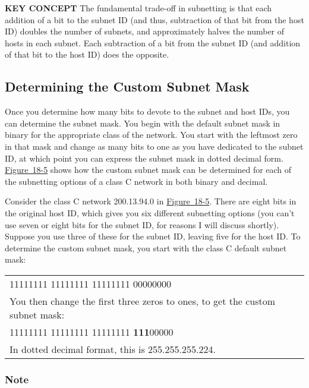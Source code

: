 {\textbf{KEY CONCEPT}} The fundamental trade-off in subnetting is that
each addition of a bit to the subnet ID (and thus, subtraction of that
bit from the host ID) doubles the number of subnets, and approximately
halves the number of hosts in each subnet. Each subtraction of a bit
from the subnet ID (and addition of that bit to the host ID) does the
opposite.

\subsection[Determining the Custom Subnet
Mask]{\texorpdfstring{Determining
the Custom Subnet Mask}{Determining the Custom Subnet Mask}}

Once you determine how many bits to devote to the subnet and host IDs,
you can determine the subnet mask. You begin with the default subnet
mask in binary for the appropriate class of the network. You start with
the leftmost zero in that mask and change as many bits to one as you
have dedicated to the subnet ID, at which point you can express the
subnet mask in dotted decimal form.
\protect\hyperlink{ch18s05.htmlux5cux23custom_subnet_masks_for_class_c_networks}{Figure~18-5}
shows how the custom subnet mask can be determined for each of the
subnetting options of a class C network in both binary and decimal.

Consider the class C network 200.13.94.0 in
\protect\hyperlink{ch18s05.htmlux5cux23custom_subnet_masks_for_class_c_networks}{Figure~18-5}.
There are eight bits in the original host ID, which gives you six
different subnetting options (you can't use seven or eight bits for the
subnet ID, for reasons I will discuss shortly). Suppose you use three of
these for the subnet ID, leaving five for the host ID. To determine the
custom subnet mask, you start with the class C default subnet mask:

\begin{longtable}[]{@{}l@{}}
\toprule
\endhead
11111111 11111111 11111111 00000000\tabularnewline
You then change the first three zeros to ones, to get the custom subnet
mask:\tabularnewline
11111111 11111111 11111111 {\textbf{111}}00000\tabularnewline
In dotted decimal format, this is 255.255.255.224.\tabularnewline
\bottomrule
\end{longtable}

\subsubsection[Note]{\texorpdfstring{Note}{Note}}

